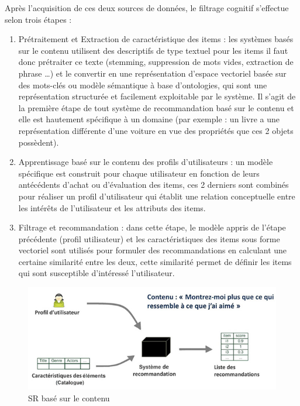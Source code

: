 \documentclass[a4paper,12pt,letterpaper,headsepline,singlespacing,headsepline, french]{report}
\begin{document}
Après l’acquisition de ces deux sources de données, le filtrage cognitif s’effectue selon trois étapes \cite{ref3}:
\begin{enumerate}
	\item  Prétraitement et Extraction de caractéristique des items : les systèmes basés sur le contenu utilisent des descriptifs de type textuel pour les items il faut donc prétraiter ce texte (stemming, suppression de mots vides, extraction de phrase …) et le convertir en une représentation d'espace vectoriel basée sur des mots-clés ou modèle sémantique à base d’ontologies, qui sont une représentation structurée et facilement exploitable par le système. Il s'agit de la première étape de tout système de recommandation basé sur le contenu et elle est hautement spécifique à un domaine (par exemple : un livre a une représentation différente d’une voiture en vue des propriétés que ces 2 objets possèdent).
	\item Apprentissage basé sur le contenu des profils d'utilisateurs : un modèle spécifique est construit pour chaque utilisateur en fonction de leurs antécédents d'achat ou d'évaluation des items, ces 2 derniers sont combinés pour réaliser un profil d'utilisateur qui établit une relation conceptuelle entre les intérêts de l'utilisateur et les attributs des items.
	\item Filtrage et recommandation : dans cette étape, le modèle appris de l'étape précédente (profil utilisateur) et les caractéristiques des items sous forme vectoriel sont utilisés pour formuler des recommandations en calculant une certaine similarité entre les deux, cette similarité permet de définir les items qui sont susceptible d’intéressé l’utilisateur. 
\end{enumerate}

\begin{figure}[H]
	\centering
		\includegraphics[width=\textwidth]{cognitif.png}
	\caption{SR basé sur le contenu \cite{ref6}}
\end{figure}
\end{document}
